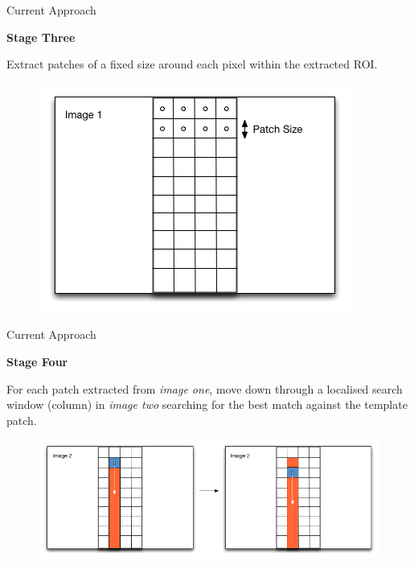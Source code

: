 \documentclass[10pt, compress]{beamer}
\begin{document}
\begin{frame}{Current Approach}

\textbf{Stage Three} \\ \vspace{0.2cm}

Extract patches of a fixed size around each pixel within the extracted ROI.

\begin{figure}[ht!]
\centering
\includegraphics[scale=0.5]{stage2.png}
  \end{figure}
  
\end{frame}

\begin{frame}{Current Approach}

\textbf{Stage Four} \\ \vspace{0.2cm}

For each patch extracted from \emph{image one}, move down through a localised search window (column) in \emph{image two} searching for the best match against the template patch. 

\begin{figure}[ht!]
\centering
\includegraphics[scale=0.35]{stage3.png}
\end{figure}
  
\end{frame}
\end{document}
